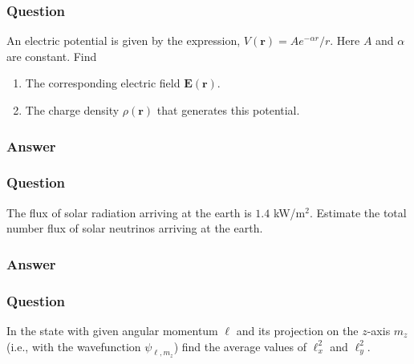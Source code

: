 \subsubsection{Question}

An electric potential is given by the expression, $V(\boldsymbol{r}) = A e^{-\alpha r}/r$. Here $A$ and $\alpha$ are constant. Find
\begin{enumerate}
	\item The corresponding electric field $\boldsymbol{E}(\boldsymbol{r}).$
	\item The charge density $\rho(\boldsymbol{r})$ that generates this potential.
\end{enumerate}
\subsubsection{Answer}



\subsubsection{Question}
The flux of solar radiation arriving at the earth is $1.4$ kW/m$^2$. Estimate the total number flux of solar neutrinos arriving at the earth.

\subsubsection{Answer}


\subsubsection{Question}
In the state with given angular momentum $\ell$ and its projection on the $z$-axis $m_z$ (i.e., with the wavefunction $\psi_{\ell,m_z}$) find the average values of $\ell^2_x$ and $\ell^2_y$.
